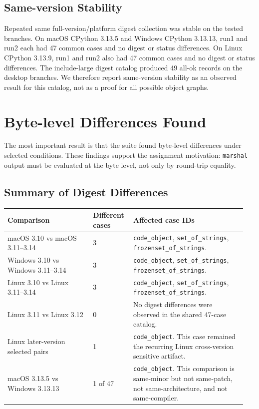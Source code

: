 \documentclass[10pt,a4paper]{article}
\begin{document}
\subsection{Same-version Stability}

Repeated same full-version/platform digest collection was stable on the tested branches. On macOS CPython 3.13.5 and Windows CPython 3.13.13, run1 and run2 each had 47 common cases and no digest or status differences. On Linux CPython 3.13.9, run1 and run2 also had 47 common cases and no digest or status differences. The include-large digest catalog produced 49 all-ok records on the desktop branches. We therefore report same-version stability as an observed result for this catalog, not as a proof for all possible object graphs.

\section{Byte-level Differences Found}

The most important result is that the suite found byte-level differences under selected conditions. These findings support the assignment motivation: \texttt{marshal} output must be evaluated at the byte level, not only by round-trip equality.

\subsection{Summary of Digest Differences}

\begingroup
\normalsize
\setlength{\tabcolsep}{6pt}
\renewcommand{\arraystretch}{1.15}

\begin{longtable}{@{}L{0.34\linewidth}L{0.16\linewidth}L{0.45\linewidth}@{}}
\toprule
\textbf{Comparison} & \textbf{Different cases} & \textbf{Affected case IDs} \\
\midrule

macOS 3.10 vs macOS 3.11--3.14 &
3 &
\texttt{code\_object}, \texttt{set\_of\_strings}, \texttt{frozenset\_of\_strings}. \\

Windows 3.10 vs Windows 3.11--3.14 &
3 &
\texttt{code\_object}, \texttt{set\_of\_strings}, \texttt{frozenset\_of\_strings}. \\

Linux 3.10 vs Linux 3.11--3.14 &
3 &
\texttt{code\_object}, \texttt{set\_of\_strings}, \texttt{frozenset\_of\_strings}. \\

Linux 3.11 vs Linux 3.12 &
0 &
No digest differences were observed in the shared 47-case catalog. \\

Linux later-version selected pairs &
1 &
\texttt{code\_object}. This case remained the recurring Linux cross-version sensitive artifact. \\

macOS 3.13.5 vs Windows 3.13.13 &
1 of 47 &
\texttt{code\_object}. This comparison is same-minor but not same-patch, not same-architecture, and not same-compiler. \\

\bottomrule
\end{longtable}
\endgroup
\end{document}
